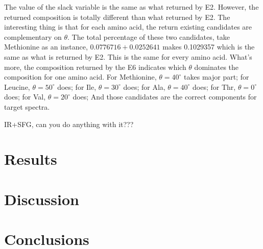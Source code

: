 The value of the slack variable is the same as what returned by E2. However, the returned composition is totally different than what returned by E2. The interesting thing is that for each amino acid, the return existing candidates are complementary on $\theta$. The total percentage of these two candidates, take Methionine as an instance, $0.0776716 + 0.0252641$ makes 0.1029357 which is the same as what is returned by E2. This is the same for every amino acid. What's more, the composition returned by the E6 indicates which $\theta$ dominates the composition for one amino acid. For Methionine, $\theta = 40^{\circ}$ takes major part; for Leucine, $\theta = 50^{\circ}$ does; for Ile, $\theta = 30^{\circ}$ does; for Ala, $\theta = 40^{\circ}$ does; for Thr, $\theta = 0^{\circ}$  does; for Val, $\theta = 20^{\circ}$ does; And those candidates are the correct components for target spectra. 




IR+SFG, can you do anything with it???




\section{Results}
\section{Discussion}
\section{Conclusions}
\label{experimental}


